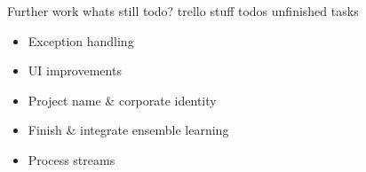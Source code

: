 \begin{frame}{Further work}
	whats still todo?
	trello stuff todos
	unfinished tasks
	\begin{itemize}
		\item Exception handling
		\item UI improvements
		\item Project name \& corporate identity
		\item Finish \& integrate ensemble learning
		\item Process streams
	\end{itemize}
\end{frame}